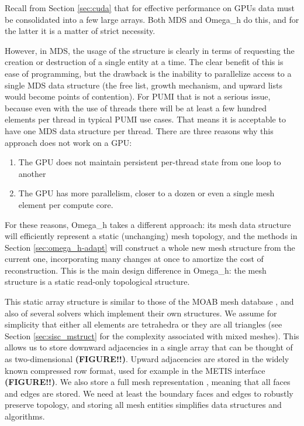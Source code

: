 Recall from Section \ref{sec:cuda} that for effective
performance on GPUs data must be consolidated into
a few large arrays.
Both MDS and Omega\_h do this, and for the latter it is
a matter of strict necessity.

However, in MDS, the usage of the structure is clearly in terms
of requesting the creation or destruction of a single entity at
a time.
The clear benefit of this is ease of programming, but the drawback
is the inability to parallelize access to a single MDS data structure
(the free list, growth mechanism, and upward lists would become
points of contention).
For PUMI that is not a serious issue, because even with the use of
threads there will be at least a few hundred elements per thread
in typical PUMI use cases.
That means it is acceptable to have one MDS data structure per thread.
There are three reasons why this approach does not work on a GPU:
\begin{enumerate}
\item The GPU does not maintain persistent per-thread state from
one loop to another
\item The GPU has more parallelism, closer to a dozen or even
a single mesh element per compute core.
\end{enumerate}
For these reasons, Omega\_h takes a different approach:
its mesh data structure will efficiently represent a static
(unchanging) mesh topology, and the methods in Section \ref{sec:omega_h-adapt}
will construct a whole new mesh structure from the current
one, incorporating many changes at once to amortize the
cost of reconstruction.
This is the main design difference in Omega\_h: the mesh
structure is a static read-only topological structure.

This static array structure is similar to those
of the MOAB mesh database \cite{tautges2004moab},
and also of several solvers which implement their own structures.
We assume for simplicity that either all elements are tetrahedra
or they are all triangles (see Section \ref{sec:sisc_mstruct} for
the complexity associated with mixed meshes).
This allows us to store downward adjacencies in a single array
that can be thought of as two-dimensional {\bf (FIGURE!!)}.
Upward adjacencies are stored in the widely known compressed row format,
used for example in the METIS interface \cite{METIS}
{\bf (FIGURE!!)}.
We also store a full mesh representation \cite{beall1997general}, meaning
that all faces and edges are stored.
We need at least the boundary faces and edges to robustly preserve
topology, and storing all mesh entities simplifies data structures
and algorithms.

